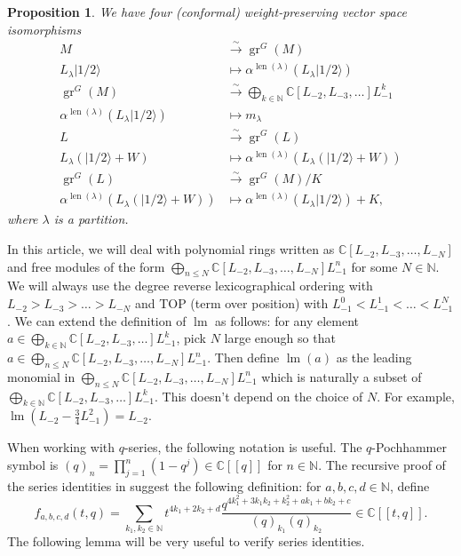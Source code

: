 \documentclass[12pt, reqno]{amsart}
\newtheorem{proposition}[theorem]{Proposition}
\theoremstyle{remark}
\DeclareMathOperator{\gr}{gr}
\DeclareMathOperator{\lm}{lm}
\DeclareMathOperator{\len}{len}
\newcommand{\vachalf}{|1/2\rangle}
\begin{document}
\begin{proposition}
  \label{prp:7}
  We have four (conformal) weight-preserving vector space isomorphisms
  \begin{align*}
    M &\xrightarrow{\sim} \gr^G(M) \\
    L_\lambda\vachalf &\mapsto \alpha^{\len(\lambda)}(L_\lambda\vachalf) \\
    \gr^G(M) &\xrightarrow{\sim} \bigoplus_{k \in \mathbb{N}}\mathbb{C}[L_{-2}, L_{-3}, \dots]L_{-1}^k \\
    \alpha^{\len(\lambda)}(L_\lambda\vachalf) &\mapsto m_\lambda \\
    L &\xrightarrow{\sim} \gr^G(L) \\
    L_\lambda(\vachalf + W) &\mapsto \alpha^{\len(\lambda)}(L_\lambda(\vachalf + W)) \\
    \gr^G(L) &\xrightarrow{\sim} \gr^G(M)/K \\
    \alpha^{\len(\lambda)}(L_\lambda(\vachalf + W)) &\mapsto \alpha^{\len(\lambda)}(L_\lambda\vachalf) + K,
  \end{align*}
  where $\lambda$ is a partition.
\end{proposition}

In this article, we will deal with polynomial rings written as $\mathbb{C}[L_{-2}, L_{-3}, \dots, L_{-N}]$ and free modules of the form $\bigoplus_{n \le N}\mathbb{C}[L_{-2}, L_{-3}, \dots, L_{-N}]L_{-1}^n$ for some $N \in \mathbb{N}$.
We will always use the degree reverse lexicographical ordering with $L_{-2} > L_{-3} > \dots > L_{-N}$ and TOP (term over position) with $L_{-1}^0 < L_{-1}^1 < \dots < L_{-1}^N$.
We can extend the definition of $\lm$ as follows: for any element $a \in \bigoplus_{k \in \mathbb{N}}\mathbb{C}[L_{-2}, L_{-3}, \dots]L_{-1}^k$, pick $N$ large enough so that $a \in \bigoplus_{n \le N}\mathbb{C}[L_{-2}, L_{-3}, \dots, L_{-N}]L_{-1}^n$.
Then define $\lm(a)$ as the leading monomial in $\bigoplus_{n \le N}\mathbb{C}[L_{-2}, L_{-3}, \dots, L_{-N}]L_{-1}^n$ which is naturally a subset of $\bigoplus_{k \in \mathbb{N}}\mathbb{C}[L_{-2}, L_{-3}, \dots]L_{-1}^k$.
This doesn't depend on the choice of $N$.
For example, $\lm(L_{-2} - \frac{3}{4}L_{-1}^2) = L_{-2}$.

When working with $q$-series, the following notation is useful.
The $q$-Pochhammer symbol is $(q)_n = \prod_{j = 1}^n(1 - q^j) \in \mathbb{C}[[q]]$ for $n \in \mathbb{N}$.
The recursive proof of the series identities in \cite{andrews_singular_2022} suggest the following definition: for $a, b, c, d \in \mathbb{N}$, define
\begin{equation*}
  f_{a, b, c, d}(t, q) = \sum_{k_1, k_2 \in \mathbb{N}}t^{4k_1 + 2k_2 + d}\frac{q^{4k_1^2 + 3k_1k_2 + k_2^2 + ak_1 + bk_2 + c}}{(q)_{k_1}(q)_{k_2}} \in \mathbb{C}[[t, q]].
\end{equation*}
The following lemma will be very useful to verify series identities.
\end{document}
